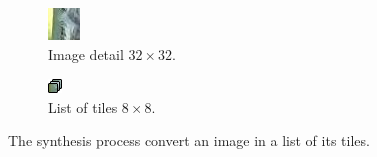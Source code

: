 \begin{figure}[ht]
    \centering
    \begin{subfigure}{0.4\linewidth}
        \includegraphics[width=\linewidth]{Figures/example_detail.png}
        \caption{Image detail $32 \times 32$.}
    \end{subfigure}
    \hspace{2cm}
    \begin{subfigure}{0.4\linewidth}
        \includegraphics[width=\linewidth]{Figures/example_tiles.png}
        \caption{List of tiles $8 \times 8$.}
    \end{subfigure}
    \caption[Illustration of synthesis process]{The synthesis process convert an image in a list of its tiles.}
    \label{fig:puffer_tiles}
\end{figure}
